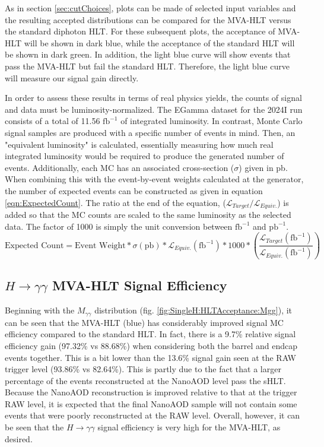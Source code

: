 \documentclass[12pt]{ucsddissertation}
\begin{document}
As in section \ref{sec:cutChoices}, plots can be made of selected input variables and the resulting accepted distributions can be compared for the MVA-HLT versus the standard diphoton HLT. For these subsequent plots, the acceptance of MVA-HLT will be shown in dark blue, while the acceptance of the standard HLT will be shown in dark green. In addition, the light blue curve will show events that pass the MVA-HLT but fail the standard HLT. Therefore, the light blue curve will measure our signal gain directly. 

In order to assess these results in terms of real physics yields, the counts of signal and data must be luminosity-normalized. The EGamma dataset for the 2024I run consists of a total of 11.56 $\mathrm{fb}^{-1}$ of integrated luminosity. In contrast, Monte Carlo signal samples are produced with a specific number of events in mind. Then, an "equivalent luminosity" is calculated, essentially measuring how much real integrated luminosity would be required to produce the generated number of events. Additionally, each MC has an associated cross-section ($\sigma$) given in pb. When combining this with the event-by-event weights calculated at the generator, the number of expected events can be constructed as given in equation \ref{eqn:ExpectedCount}. The ratio at the end of the equation, ($\mathcal{L}_{Target}/\mathcal{L}_{Equiv.}$) is added so that the MC counts are scaled to the same luminosity as the selected data. The factor of 1000 is simply the unit conversion between $\mathrm{fb}^{-1}$ and $\mathrm{pb}^{-1}$.
\begin{equation}\label{eqn:ExpectedCount}
    \text{Expected Count} = \text{Event Weight} * \sigma (\mathrm{pb}) * \mathcal{L}_{Equiv.} (\mathrm{fb}^{-1}) * 1000 * \left(\frac{\mathcal{L}_{Target} (\mathrm{fb}^{-1})}{\mathcal{L}_{Equiv.} (\mathrm{fb}^{-1})}\right)
\end{equation}

\subsection{$H \rightarrow \gamma \gamma$ MVA-HLT Signal Efficiency} \label{sec:OfflineHLTSingleH}
Beginning with the $M_{\gamma \gamma}$ distribution (fig. \ref{fig:SingleH:HLTAcceptance:Mgg}), it can be seen that the MVA-HLT (blue) has considerably improved signal MC efficiency compared to the standard HLT. In fact, there is a 9.7\% relative signal efficiency gain (97.32\% vs 88.68\%) when considering both the barrel and endcap events together. This is a bit lower than the 13.6\% signal gain seen at the RAW trigger level (93.86\% vs 82.64\%). This is partly due to the fact that a larger percentage of the events reconstructed at the NanoAOD level pass the sHLT. Because the NanoAOD reconstruction is improved relative to that at the trigger RAW level, it is expected that the final NanoAOD sample will not contain some events that were poorly reconstructed at the RAW level. Overall, however, it can be seen that the $H \rightarrow \gamma \gamma$ signal efficiency is very high for the MVA-HLT, as desired.
\end{document}
